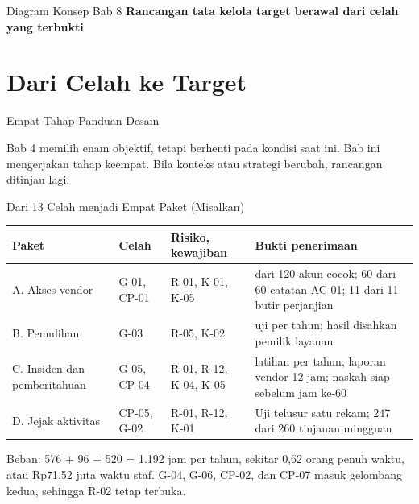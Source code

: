 \documentclass[aspectratio=169, table, 12pt]{beamer}
\begin{document}
\begin{frame}{{\Large Diagram Konsep Bab 8}}
  \centering
  {\small\bfseries Rancangan tata kelola target berawal dari celah yang terbukti}\par\medskip
  \label{fig:session08-ilustrasi-bab}
\end{frame}

\section{Dari Celah ke Target}

\begin{frame}{{\Large Empat Tahap Panduan Desain}}
  \vspace{4pt}
  \begin{center}
    \resizebox{0.92\textwidth}{!}{}
  \end{center}
  \small Bab 4 memilih enam objektif, tetapi berhenti pada kondisi saat ini. Bab ini mengerjakan
  tahap keempat. Bila konteks atau strategi berubah, rancangan ditinjau lagi.
\end{frame}

\begin{frame}{{\Large Dari 13 Celah menjadi Empat Paket (Misalkan)}}
  \vspace{2pt}
  \scriptsize
  \begin{tabularx}{\textwidth}{|>{\raggedright\arraybackslash}p{}|>{\raggedright\arraybackslash}p{}|>{\raggedright\arraybackslash}p{}|>{\raggedright\arraybackslash}X|}
    \hline
    \textbf{Paket} & \textbf{Celah} & \textbf{Risiko, kewajiban} & \textbf{Bukti penerimaan} \\
    \hline
    A. Akses vendor & G-01, CP-01 & R-01, K-01, K-05 & 120 dari 120 akun cocok; 60 dari 60 catatan
    AC-01; 11 dari 11 butir perjanjian \\ \hline
    B. Pemulihan & G-03 & R-05, K-02 & 144 uji per tahun; hasil disahkan pemilik layanan \\ \hline
    C. Insiden dan pemberitahuan & G-05, CP-04 & R-01, R-12, K-04, K-05 & 2 latihan per tahun;
    laporan vendor 12 jam; naskah siap sebelum jam ke-60 \\ \hline
    D. Jejak aktivitas & CP-05, G-02 & R-01, R-12, K-01 & Uji telusur satu rekam; 247 dari 260
    tinjauan mingguan \\ \hline
  \end{tabularx}

  \vspace{6pt}
  \small Beban: 576 + 96 + 520 = 1.192 jam per tahun, sekitar 0,62 orang penuh waktu, atau Rp71,52
  juta waktu staf. G-04, G-06, CP-02, dan CP-07 masuk gelombang kedua, sehingga R-02 tetap terbuka.
\end{frame}
\end{document}
